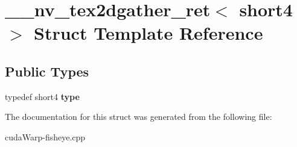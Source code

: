\hypertarget{struct____nv__tex2dgather__ret_3_01short4_01_4}{}\section{\+\_\+\+\_\+nv\+\_\+tex2dgather\+\_\+ret$<$ short4 $>$ Struct Template Reference}
\label{struct____nv__tex2dgather__ret_3_01short4_01_4}
\subsection*{Public Types}
\begin{DoxyCompactItemize}
\item 
typedef short4 {\bfseries type}\hypertarget{struct____nv__tex2dgather__ret_3_01short4_01_4_aa284d9728b77c64986076a6260a20918}{}\label{struct____nv__tex2dgather__ret_3_01short4_01_4_aa284d9728b77c64986076a6260a20918}

\end{DoxyCompactItemize}


The documentation for this struct was generated from the following file\+:\begin{DoxyCompactItemize}
\item 
cuda\+Warp-\/fisheye.\+cpp\end{DoxyCompactItemize}
